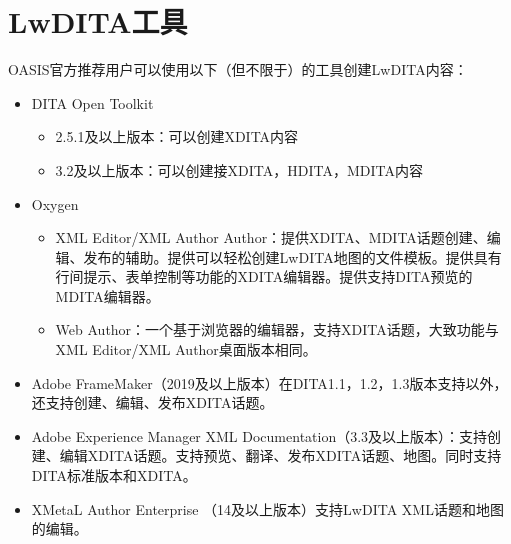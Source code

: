 \documentclass[letterpaper,10pt,english]{sphinxmanual}
\begin{document}
\chapter{LwDITA工具}
\label{\detokenize{chap5:lwdita}}\label{\detokenize{chap5::doc}}
OASIS官方推荐用户可以使用以下（但不限于）的工具创建LwDITA内容：
\begin{itemize}
\item {} 
DITA Open Toolkit
\begin{itemize}
\item {} 
2.5.1及以上版本：可以创建XDITA内容

\item {} 
3.2及以上版本：可以创建接XDITA，HDITA，MDITA内容

\end{itemize}

\item {} 
Oxygen
\begin{itemize}
\item {} 
XML Editor/XML Author Author：提供XDITA、MDITA话题创建、编辑、发布的辅助。提供可以轻松创建LwDITA地图的文件模板。提供具有行间提示、表单控制等功能的XDITA编辑器。提供支持DITA预览的MDITA编辑器。

\item {} 
Web Author：一个基于浏览器的编辑器，支持XDITA话题，大致功能与XML Editor/XML Author桌面版本相同。

\end{itemize}

\item {} 
Adobe FrameMaker（2019及以上版本）在DITA1.1，1.2，1.3版本支持以外，还支持创建、编辑、发布XDITA话题。

\item {} 
Adobe Experience Manager XML Documentation（3.3及以上版本）：支持创建、编辑XDITA话题。支持预览、翻译、发布XDITA话题、地图。同时支持DITA标准版本和XDITA。

\item {} 
XMetaL Author Enterprise （14及以上版本）支持LwDITA XML话题和地图的编辑。

\end{itemize}



\renewcommand{\indexname}{索引}
\printindex
\end{document}
